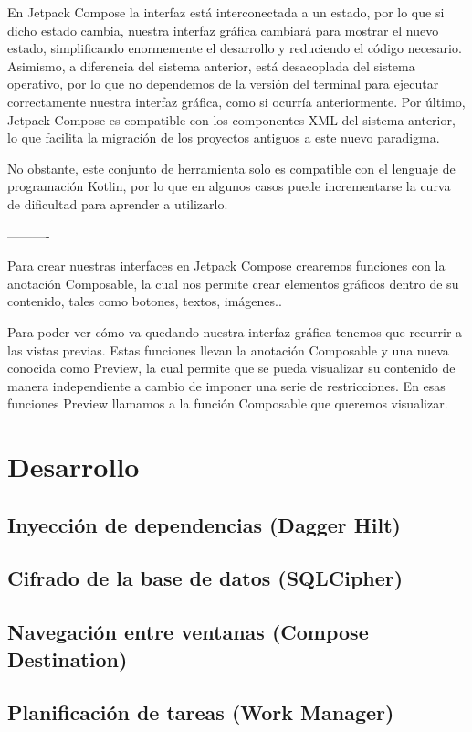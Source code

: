             En Jetpack Compose la interfaz está interconectada a un estado, por lo que si dicho estado cambia, nuestra interfaz gráfica cambiará para mostrar el nuevo estado, simplificando enormemente el desarrollo y reduciendo el código necesario. Asimismo, a diferencia del sistema anterior, está desacoplada del sistema operativo, por lo que no dependemos de la versión del terminal para ejecutar correctamente nuestra interfaz gráfica, como si ocurría anteriormente. Por último, Jetpack Compose es compatible con los componentes XML del sistema anterior, lo que facilita la migración de los proyectos antiguos a este nuevo paradigma.

            No obstante, este conjunto de herramienta solo es compatible con el lenguaje de programación Kotlin, por lo que en algunos casos puede incrementarse la curva de dificultad para aprender a utilizarlo.

            ----------

            Para crear nuestras interfaces en Jetpack Compose crearemos funciones con la anotación Composable, la cual nos permite crear elementos gráficos dentro de su contenido, tales como botones, textos, imágenes..

            Para poder ver cómo va quedando nuestra interfaz gráfica tenemos que recurrir a las vistas previas. Estas funciones llevan la anotación Composable y una nueva conocida como Preview, la cual permite que se pueda visualizar su contenido de manera independiente a cambio de imponer una serie de restricciones. En esas funciones Preview llamamos a la función Composable que queremos visualizar.


    \section{Desarrollo}
        \subsection{Inyección de dependencias (Dagger Hilt)}
        \subsection{Cifrado de la base de datos (SQLCipher)}
        \subsection{Navegación entre ventanas (Compose Destination)}
        \subsection{Planificación de tareas (Work Manager)}
